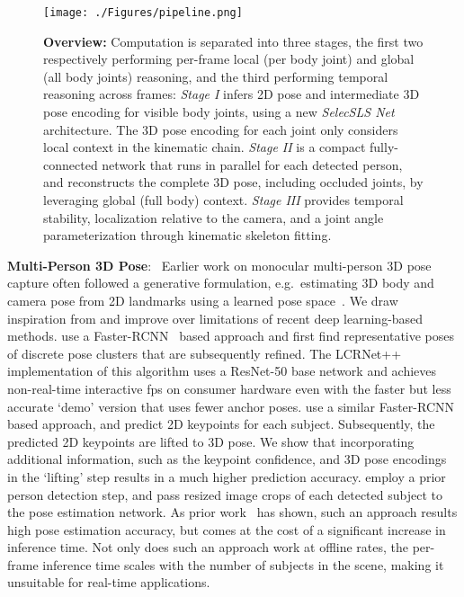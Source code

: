 \documentclass[acmtog,authorversion]{acmart}
\newcommand{\parahead}[1]{\textbf{#1}:\ }
\newcommand{\eg}{e.g.~}
\begin{document}
\begin{figure*}[t]
  \texttt{[image: ./Figures/pipeline.png]}
  \caption
  {\textbf{Overview:} Computation is separated into three stages, the first two respectively performing per-frame local (per body joint) and global (all body joints) reasoning, and the third performing temporal reasoning across frames: 
  \textit{Stage I} infers 2D pose and intermediate 3D pose encoding for visible body joints, using a new \textit{SelecSLS Net} architecture. The 3D pose encoding for each joint only considers local context in the kinematic chain. \textit{Stage II} is a compact fully-connected network that runs in parallel for each detected person, and reconstructs the complete 3D pose, including occluded joints, by leveraging global (full body) context. \textit{Stage III} provides temporal stability, localization relative to the camera, and a joint angle parameterization through kinematic skeleton fitting.
}
  \label{fig:pipeline}
\end{figure*}


\parahead{Multi-Person 3D Pose}
Earlier work on monocular multi-person 3D pose capture often followed a generative formulation, \eg estimating 3D body and camera pose from 2D landmarks using a learned pose space~\cite{ramakrishna2012reconstructing}.
We draw inspiration from and improve over limitations of recent deep learning-based methods.
\citet{rogez_lcr_cvpr17} 
use a Faster-RCNN~ based approach and first find representative poses of discrete pose clusters that are subsequently refined.
The LCRNet++ implementation of this algorithm uses a ResNet-50 base network 
and achieves non-real-time interactive fps on consumer hardware even with the faster but less accurate `demo' version that uses fewer anchor poses.
\citet{dabral2019multi} use a similar Faster-RCNN based approach, and predict 2D keypoints for each subject. Subsequently, the predicted 2D keypoints are lifted to 3D pose. We show that incorporating additional information, such as the keypoint confidence, and 3D pose encodings in the `lifting' step results in a much higher prediction accuracy. 
\citet{Moon_2019_ICCV_3DMPPE} employ a prior person detection step, and pass resized image crops of each detected subject to the pose estimation network. As prior work~\citep{cao_affinity_2017} has shown, such an approach results high pose estimation accuracy, but comes at the cost of a significant increase in inference time. Not only does such an approach work at offline rates, the per-frame inference time scales with the number of subjects in the scene, making it unsuitable for real-time applications.
\end{document}
